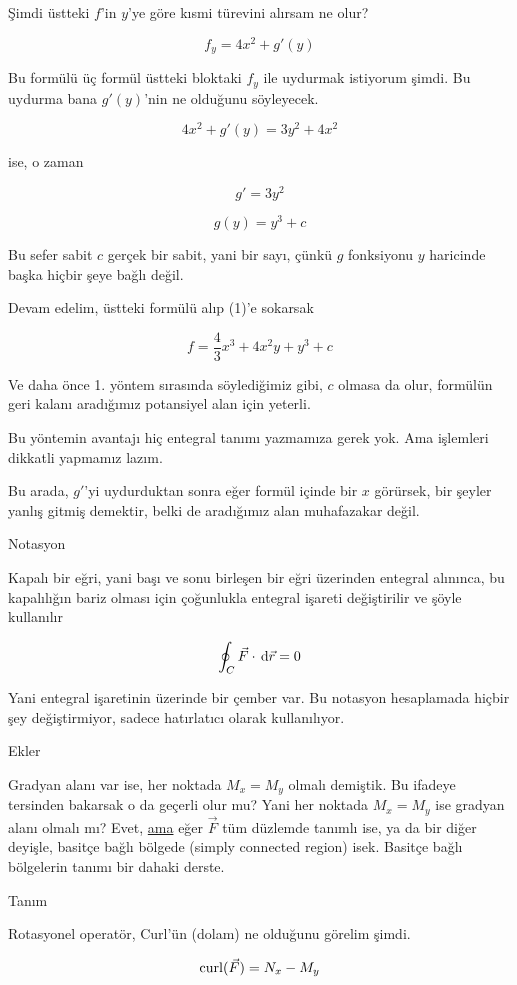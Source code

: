 \documentclass[12pt,fleqn]{article}\usepackage{../../common}
\begin{document}
Şimdi üstteki $f$'in $y$'ye göre kısmi türevini alırsam ne olur?

$$ f_y = 4x^2 + g'(y) $$

Bu formülü üç formül üstteki bloktaki $f_y$ ile uydurmak istiyorum şimdi. Bu
uydurma bana $g'(y)$'nin ne olduğunu söyleyecek.

$$ 4x^2 + g'(y) = 3y^2 + 4x^2 $$

ise, o zaman

$$ g' = 3y^2 $$

$$ g(y) = y^3 + c $$

Bu sefer sabit $c$ gerçek bir sabit, yani bir sayı, çünkü $g$ fonksiyonu $y$
haricinde başka hiçbir şeye bağlı değil.

Devam edelim, üstteki formülü alıp (1)'e sokarsak

$$ f = \frac{4}{3}x^3 + 4x^2y + y^3 + c$$

Ve daha önce 1. yöntem sırasında söylediğimiz gibi, $c$ olmasa da olur, formülün
geri kalanı aradığımız potansiyel alan için yeterli.

Bu yöntemin avantajı hiç entegral tanımı yazmamıza gerek yok. Ama işlemleri
dikkatli yapmamız lazım.

Bu arada, $g'$'yi uydurduktan sonra eğer formül içinde bir $x$ görürsek, bir
şeyler yanlış gitmiş demektir, belki de aradığımız alan muhafazakar değil.

Notasyon 

Kapalı bir eğri, yani başı ve sonu birleşen bir eğri üzerinden entegral
alınınca, bu kapalılığın bariz olması için çoğunlukla entegral işareti
değiştirilir ve şöyle kullanılır

$$ \oint_{C} \vec{F} \cdot \,\mathrm{d}\vec{r} = 0$$

Yani entegral işaretinin üzerinde bir çember var. Bu notasyon hesaplamada hiçbir
şey değiştirmiyor, sadece hatırlatıcı olarak kullanılıyor.

Ekler

Gradyan alanı var ise, her noktada $M_x = M_y$ olmalı demiştik. Bu ifadeye
tersinden bakarsak o da geçerli olur mu? Yani her noktada $M_x = M_y$ ise
gradyan alanı olmalı mı? Evet, \underline{ama} eğer $\vec{F}$ tüm düzlemde
tanımlı ise, ya da bir diğer deyişle, basitçe bağlı bölgede (simply connected
region) isek. Basitçe bağlı bölgelerin tanımı bir dahaki derste.

Tanım

Rotasyonel operatör, Curl'ün (dolam) ne olduğunu görelim şimdi.

$$ \operatorname{curl} (\vec{F}) = N_x - M_y $$
\end{document}
